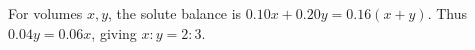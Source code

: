 For volumes $x,y$, the solute balance is $0.10x+0.20y=0.16(x+y)$. Thus $0.04y=0.06x$, giving $\boxed{x:y=2:3}$.
